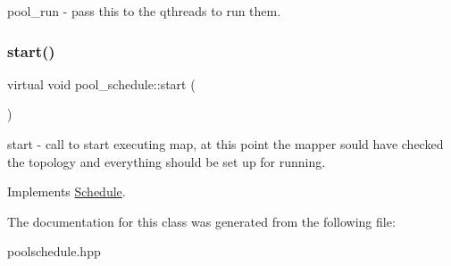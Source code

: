 pool\+\_\+run -\/ pass this to the qthreads to run them. \hypertarget{classpool__schedule_a9dd6194fd47fd0b12d2b62dcc57e38c2}{}\label{classpool__schedule_a9dd6194fd47fd0b12d2b62dcc57e38c2} 
\subsubsection{\texorpdfstring{start()}{start()}}
{\footnotesize\ttfamily virtual void pool\+\_\+schedule\+::start (\begin{DoxyParamCaption}{ }\end{DoxyParamCaption})\hspace{0.3cm}{\ttfamily [virtual]}}

start -\/ call to start executing map, at this point the mapper sould have checked the topology and everything should be set up for running. 

Implements \hyperlink{class_schedule_ab6ad5540ecdef6b472b4e8242a47c4ee}{Schedule}.



The documentation for this class was generated from the following file\+:\begin{DoxyCompactItemize}
\item 
poolschedule.\+hpp\end{DoxyCompactItemize}
